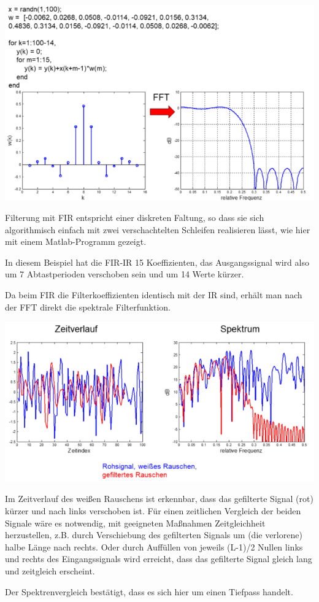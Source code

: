 \documentclass[a4paper]{article}
\begin{document}
\begin{multicols}{3}
  \begin{itemize*}
    \item \includegraphics[width=.5\linewidth]{Assets/Biosignalverarbeitung-fir-realisierung-5.png}
    \begin{itemize*}
      \item Filterung mit FIR entspricht einer diskreten Faltung, so dass sie sich algorithmisch einfach mit zwei verschachtelten Schleifen realisieren lässt, wie hier mit einem Matlab-Programm gezeigt.
      \item In diesem Beispiel hat die FIR-IR 15 Koeffizienten, das Ausgangssignal wird also um 7 Abtastperioden verschoben sein und um 14 Werte kürzer.
      \item Da beim FIR die Filterkoeffizienten identisch mit der IR sind, erhält man nach der FFT direkt die spektrale Filterfunktion.
    \end{itemize*}
    \item \includegraphics[width=.5\linewidth]{Assets/Biosignalverarbeitung-fir-realisierung-6.png}
    \begin{itemize*}
      \item Im Zeitverlauf des weißen Rauschens ist erkennbar, dass das gefilterte Signal (rot) kürzer und nach links verschoben ist. Für einen zeitlichen Vergleich der beiden Signale wäre es notwendig, mit geeigneten Maßnahmen Zeitgleichheit herzustellen, z.B. durch Verschiebung des gefilterten Signals um (die verlorene) halbe Länge nach rechts. Oder durch Auffüllen von jeweils (L-1)/2 Nullen links und rechts des Eingangssignals wird erreicht, dass das gefilterte Signal gleich lang und zeitgleich erscheint.
      \item Der Spektrenvergleich bestätigt, dass es sich hier um einen Tiefpass handelt.
    \end{itemize*}
  \end{itemize*}


\end{multicols}
\end{document}
